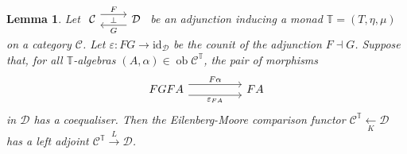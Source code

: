 \documentclass[a4paper,11pt]{article}
\theoremstyle{break_italics}
\newtheorem*{lemma*}{Lemma}
\theoremstyle{break_upright}
\theoremstyle{remark}
\newcommand{\id}{\mathrm{id}}
\newcommand{\ob}{\operatorname{ob}}
\newcommand{\C}{\mathcal{C}}
\newcommand{\D}{\mathcal{D}}
\begin{document}
\begin{lemma*}
	Let $\begin{tikzcd}
	\C & \D
	\arrow["\bot"{description}, draw=none, from=1-1, to=1-2]
	\arrow["F", shift left=2, from=1-1, to=1-2]
	\arrow["G", shift left=2, from=1-2, to=1-1]
\end{tikzcd}$ be an adjunction inducing a monad $\mathbb T = (T, \eta, \mu)$ on a category $\C$. Let $\varepsilon \colon FG \to \id_\D$ be the counit of the adjunction $F \dashv G$. Suppose that, for all $\mathbb T$-algebras $(A, \alpha) \in \ob\C^{\mathbb T}$, the pair of morphisms
\[
\begin{tikzcd}
FGFA \arrow[rr, "F\alpha", shift left=2] \arrow[rr, "\varepsilon_{FA}"', shift right=2] &  & FA
\end{tikzcd}
\]
in $\D$ has a coequaliser. Then the Eilenberg-Moore comparison functor $\C^{\mathbb T} \xleftarrow[K]{} \D$ has a left adjoint $\C^{\mathbb T} \xrightarrow{L} \D$.
\end{lemma*}
\end{document}
